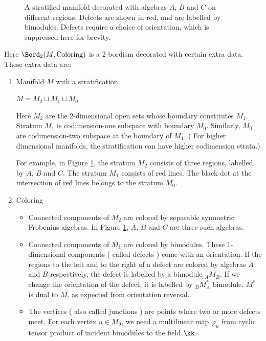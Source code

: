 \begin{defectfiguresetup}
\begin{figure}[ht]
	\caption{A stratified manifold decorated with algebras $A$, $B$ and $C$ on different regions. Defects are shown in red, and are labelled by bimodules. Defects require a choice of orientation, which is suppressed here for brevity.}
	\label{f:stratified_pretzel}
\end{figure}	


Here $\Bord_2(M,\mathrm{Coloring})$ is a 2-bordism decorated with certain extra data. These extra data are:
\begin{enumerate}
	\item Manifold $M$ with a stratification
	
	$M=M_2 \sqcup M_1 \sqcup M_0$
	
	Here $M_2$ are the 2-dimensional open sets whose boundary constitutes $M_1$.  Stratum $M_1$ is codimension-one subspace with boundary $M_0$. Similarly, $M_0$ are codimension-two subspace at the boundary of $M_1$. ( For higher dimensional manifolds, the stratification can have higher codimension strata.)
	
	For example, in Figure \ref{f:stratified_pretzel}, the stratum $M_2$ consists of three regions, labelled by $A$, $B$ and $C$. The stratum $M_1$ consists of red lines. The black dot at the intersection of red lines belongs to the stratum $M_0$.
	
	\item Coloring
	\begin{itemize}
		\item Connected components of $M_2$ are colored by separable symmetric Frobenius algebras. In Figure \ref{f:stratified_pretzel}, $A$, $B$ and $C$ are three such algebras.
		\item Connected components of $M_1$ are colored by bimodules. These 1-dimensional components ( called defects ) come with an orientation. If the regions to the left and to the right of a defect are colored by algebras $A$ and $B$ respectively, the defect is labelled by a bimodule $ _AM_B$. If we change the orientation of the defect, it is labelled by $ _BM^{*}_A$ bimodule. $M^*$ is dual to $M$, as expected from orientation reversal.
		\item The vertices ( also called junctions ) are points where two or more defects meet. For each vertex $u \in M_0$, we need a multilinear map $ \varphi_u$ from cyclic tensor product of incident bimodules to the field $\kk$. 
		

\end{itemize}
\end{enumerate}
\end{defectfiguresetup}
